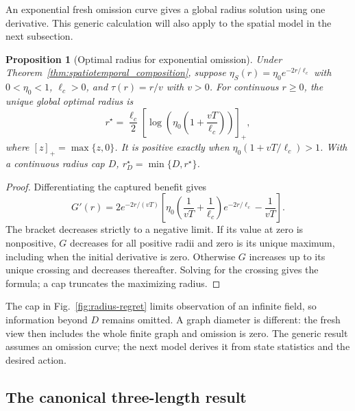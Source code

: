 \documentclass[11pt]{article}
\newtheorem{proposition}{Proposition}
\begin{document}
An exponential fresh omission curve gives a global radius solution using
one derivative. This generic calculation will also apply to the spatial
model in the next subsection.

\begin{proposition}[Optimal radius for exponential omission]
\label{prop:generic_exponential_radius}
Under Theorem~\ref{thm:spatiotemporal_composition}, suppose
$\eta_S(r)=\eta_0e^{-2r/\ell_c}$ with $0<\eta_0<1$, $\ell_c>0$,
and $\tau(r)=r/v$ with $v>0$. For continuous $r\ge0$, the unique global
optimal radius is
\begin{equation}
\boxed{r^\star=\frac{\ell_c}{2}
\left[\log\!\left(\eta_0\left(1+\frac{vT}{\ell_c}\right)\right)\right]_+,}
\label{eq:generic_exponential_rstar}
\end{equation}
where $[z]_+=\max\{z,0\}$. It is positive exactly when
$\eta_0(1+vT/\ell_c)>1$. With a continuous radius cap $D$,
$r_D^\star=\min\{D,r^\star\}$.
\end{proposition}
\begin{proof}
Differentiating the captured benefit gives
\[
G'(r)=2e^{-2r/(vT)}\left[
\eta_0\left(\frac{1}{vT}+\frac{1}{\ell_c}\right)e^{-2r/\ell_c}
-\frac{1}{vT}\right].
\]
The bracket decreases strictly to a negative limit. If its value at zero
is nonpositive, $G$ decreases for all positive radii and zero is its unique
maximum, including when the initial derivative is zero. Otherwise $G$
increases up to its unique crossing and decreases thereafter. Solving for
the crossing gives the formula; a cap truncates the maximizing radius.
\end{proof}

The cap in Fig.~\ref{fig:radius-regret} limits observation of an infinite
field, so information beyond $D$ remains omitted. A graph diameter is
different: the fresh view then includes the whole finite graph and omission
is zero. The generic result assumes an omission curve; the next model
derives it from state statistics and the desired action.

\subsection{The canonical three-length result}
\label{subsec:canonical_line_model}
\end{document}
